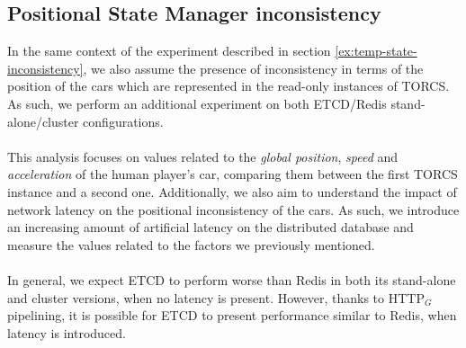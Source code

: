 \subsection{Positional State Manager inconsistency}
In the same context of the experiment described in section \ref{ex:temp-state-inconsistency}, we also assume the presence of inconsistency in terms of the position of the cars which are represented in the read-only instances of TORCS. As such, we perform an additional experiment on both ETCD/Redis stand-alone/cluster configurations. \\ \\
This analysis focuses on values related to the \textit{global position}, \textit{speed} and \textit{acceleration} of the human player's car, comparing them between the first TORCS instance and a second one. Additionally, we also aim to understand the impact of network latency on the positional inconsistency of the cars. As such, we introduce an increasing amount of artificial latency on the distributed database and measure the values related to the factors we previously mentioned. \\ \\
In general, we expect ETCD to perform worse than Redis in both its stand-alone and cluster versions, when no latency is present. However, thanks to HTTP$_G$ pipelining, it is possible for ETCD to present performance similar to Redis, when latency is introduced.

